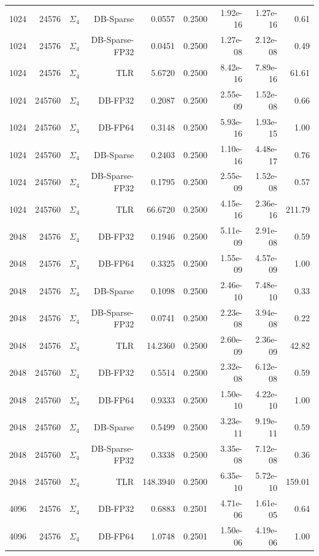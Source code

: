 \begin{tabular}{|r|r|r|r|r|r|r|r|r|}
  1024 & 24576 & $\Sigma_4$ & DB-Sparse & 0.0557 & 0.2500 & 1.92e-16 & 1.27e-16 & 0.61 \\
  1024 & 24576 & $\Sigma_4$ & DB-Sparse-FP32 & 0.0451 & 0.2500 & 1.27e-08 & 2.12e-08 & 0.49 \\
  1024 & 24576 & $\Sigma_4$ & TLR & 5.6720 & 0.2500 & 8.42e-16 & 7.89e-16 & 61.61 \\
  1024 & 245760 & $\Sigma_4$ & DB-FP32 & 0.2087 & 0.2500 & 2.55e-09 & 1.52e-08 & 0.66 \\
  1024 & 245760 & $\Sigma_4$ & DB-FP64 & 0.3148 & 0.2500 & 5.93e-16 & 1.93e-15 & 1.00 \\
  1024 & 245760 & $\Sigma_4$ & DB-Sparse & 0.2403 & 0.2500 & 1.10e-16 & 4.48e-17 & 0.76 \\
  1024 & 245760 & $\Sigma_4$ & DB-Sparse-FP32 & 0.1795 & 0.2500 & 2.55e-09 & 1.52e-08 & 0.57 \\
  1024 & 245760 & $\Sigma_4$ & TLR & 66.6720 & 0.2500 & 4.15e-16 & 2.36e-16 & 211.79 \\
  2048 & 24576 & $\Sigma_4$ & DB-FP32 & 0.1946 & 0.2500 & 5.11e-09 & 2.91e-08 & 0.59 \\
  2048 & 24576 & $\Sigma_4$ & DB-FP64 & 0.3325 & 0.2500 & 1.55e-09 & 4.57e-09 & 1.00 \\
  2048 & 24576 & $\Sigma_4$ & DB-Sparse & 0.1098 & 0.2500 & 2.46e-10 & 7.48e-10 & 0.33 \\
  2048 & 24576 & $\Sigma_4$ & DB-Sparse-FP32 & 0.0741 & 0.2500 & 2.23e-08 & 3.94e-08 & 0.22 \\
  2048 & 24576 & $\Sigma_4$ & TLR & 14.2360 & 0.2500 & 2.60e-09 & 2.36e-09 & 42.82 \\
  2048 & 245760 & $\Sigma_4$ & DB-FP32 & 0.5514 & 0.2500 & 2.32e-08 & 6.12e-08 & 0.59 \\
  2048 & 245760 & $\Sigma_4$ & DB-FP64 & 0.9333 & 0.2500 & 1.50e-10 & 4.22e-10 & 1.00 \\
  2048 & 245760 & $\Sigma_4$ & DB-Sparse & 0.5499 & 0.2500 & 3.23e-11 & 9.19e-11 & 0.59 \\
  2048 & 245760 & $\Sigma_4$ & DB-Sparse-FP32 & 0.3338 & 0.2500 & 3.35e-08 & 7.12e-08 & 0.36 \\
  2048 & 245760 & $\Sigma_4$ & TLR & 148.3940 & 0.2500 & 6.35e-10 & 5.72e-10 & 159.01 \\
  4096 & 24576 & $\Sigma_4$ & DB-FP32 & 0.6883 & 0.2501 & 4.71e-06 & 1.61e-05 & 0.64 \\
  4096 & 24576 & $\Sigma_4$ & DB-FP64 & 1.0748 & 0.2501 & 1.50e-06 & 4.19e-06 & 1.00 \\

\end{tabular}
